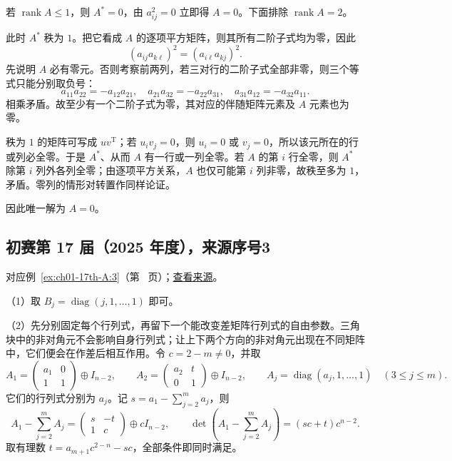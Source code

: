 \documentclass[UTF8,12pt,a4paper,fontset=fandol]{ctexart}
\begin{document}
\begin{solve}

若 $\operatorname{rank}A\leq1$，则 $A^*=0$，由 $a_{ij}^2=0$ 立即得 $A=0$。下面排除 $\operatorname{rank}A=2$。

此时 $A^*$ 秩为 $1$。把它看成 $A$ 的逐项平方矩阵，则其所有二阶子式均为零，因此
\[
(a_{ij}a_{k\ell})^2=(a_{i\ell}a_{kj})^2.
\]
先说明 $A$ 必有零元。否则考察前两列，若三对行的二阶子式全部非零，则三个等式只能分别取负号：
\[
a_{11}a_{22}=-a_{12}a_{21},\quad
 a_{21}a_{32}=-a_{22}a_{31},\quad
 a_{31}a_{12}=-a_{32}a_{11}.
\]
相乘矛盾。故至少有一个二阶子式为零，其对应的伴随矩阵元素及 $A$ 元素也为零。

秩为 $1$ 的矩阵可写成 $uv^{\mathrm T}$；若 $u_i v_j=0$，则 $u_i=0$ 或 $v_j=0$，所以该元所在的行或列必全零。于是 $A^*$、从而 $A$ 有一行或一列全零。若 $A$ 的第 $i$ 行全零，则 $A^*$ 除第 $i$ 列外各列全零；由逐项平方关系，$A$ 也仅可能第 $i$ 列非零，故秩至多为 $1$，矛盾。零列的情形对转置作同样论证。

因此唯一解为 $A=0$。

\end{solve}

\subsection{初赛第 17 届（2025 年度），来源序号3}\label{ans:ch01-17th-A:3}\label{pr:ch01-17th-A:3}

对应例~\ref{ex:ch01-17th-A:3}（第~\pageref{ex:ch01-17th-A:3} 页）；\href{https://github.com/lzxcr/cmc-mathematics/blob/64916fa1fdbc3e444a652eca204d5669058ee321/src/problems/preliminary/17/03.md}{查看来源}。

\begin{solve}

（1）取 $B_j=\operatorname{diag}(j,1,\ldots,1)$ 即可。

（2）先分别固定每个行列式，再留下一个能改变差矩阵行列式的自由参数。三角块中的非对角元不会影响自身行列式；让上下两个方向的非对角元出现在不同矩阵中，它们便会在作差后相互作用。令 $c=2-m\neq0$，并取
\[
A_1=\begin{pmatrix}a_1&0\\1&1\end{pmatrix}\oplus I_{n-2},
\qquad
A_2=\begin{pmatrix}a_2&t\\0&1\end{pmatrix}\oplus I_{n-2},
\qquad
A_j=\operatorname{diag}(a_j,1,\ldots,1)\quad(3\leq j\leq m).
\]
它们的行列式分别为 $a_j$。记 $s=a_1-\sum_{j=2}^m a_j$，则
\[
A_1-\sum_{j=2}^mA_j
=\begin{pmatrix}s&-t\\1&c\end{pmatrix}\oplus cI_{n-2},
\qquad
\det\left(A_1-\sum_{j=2}^mA_j\right)=(sc+t)c^{n-2}.
\]
取有理数 $t=a_{m+1}c^{2-n}-sc$，全部条件即同时满足。

\end{solve}
\end{document}
